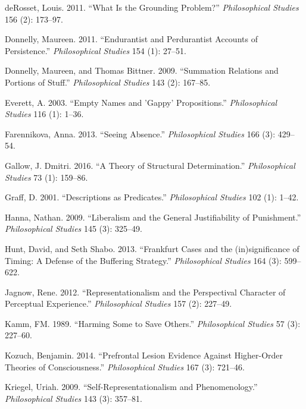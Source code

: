 \documentclass[
  10pt,
  letterpaper,
  DIV=11,
  numbers=noendperiod,
  twoside]{scrartcl}
\newlength{\cslhangindent}
\newenvironment{CSLReferences}[2] %
 {\begin{list}{}{%
  \setlength{\itemindent}{0pt}
  \setlength{\leftmargin}{0pt}
  \setlength{\parsep}{0pt}
  \ifodd #1
   \setlength{\leftmargin}{\cslhangindent}
   \setlength{\itemindent}{-1\cslhangindent}
  \fi
  \setlength{\itemsep}{#2\baselineskip}}}
 {\end{list}}
\begin{document}
\begin{CSLReferences}{1}{0}
deRosset, Louis. 2011. {``What Is the Grounding Problem?''}
\emph{Philosophical Studies} 156 (2): 173--97.

Donnelly, Maureen. 2011. {``Endurantist and Perdurantist Accounts of
Persistence.''} \emph{Philosophical Studies} 154 (1): 27--51.

Donnelly, Maureen, and Thomas Bittner. 2009. {``Summation Relations and
Portions of Stuff.''} \emph{Philosophical Studies} 143 (2): 167--85.

Everett, A. 2003. {``Empty Names and 'Gappy' Propositions.''}
\emph{Philosophical Studies} 116 (1): 1--36.

Farennikova, Anna. 2013. {``Seeing Absence.''} \emph{Philosophical
Studies} 166 (3): 429--54.

Gallow, J. Dmitri. 2016. {``A Theory of Structural Determination.''}
\emph{Philosophical Studies} 73 (1): 159--86.

Graff, D. 2001. {``Descriptions as Predicates.''} \emph{Philosophical
Studies} 102 (1): 1--42.

Hanna, Nathan. 2009. {``Liberalism and the General Justifiability of
Punishment.''} \emph{Philosophical Studies} 145 (3): 325--49.

Hunt, David, and Seth Shabo. 2013. {``Frankfurt Cases and the
(in)significance of Timing: A Defense of the Buffering Strategy.''}
\emph{Philosophical Studies} 164 (3): 599--622.

Jagnow, Rene. 2012. {``Representationalism and the Perspectival
Character of Perceptual Experience.''} \emph{Philosophical Studies} 157
(2): 227--49.

Kamm, FM. 1989. {``Harming Some to Save Others.''} \emph{Philosophical
Studies} 57 (3): 227--60.

Kozuch, Benjamin. 2014. {``Prefrontal Lesion Evidence Against
Higher-Order Theories of Consciousness.''} \emph{Philosophical Studies}
167 (3): 721--46.

Kriegel, Uriah. 2009. {``Self-Representationalism and Phenomenology.''}
\emph{Philosophical Studies} 143 (3): 357--81.


\end{CSLReferences}
\end{document}
